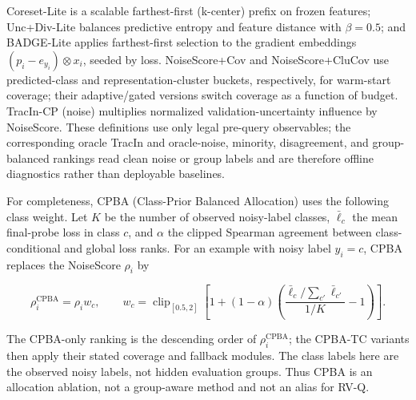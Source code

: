 \documentclass{article}
\begin{document}
Coreset-Lite is a
scalable farthest-first (k-center) prefix on frozen features;
Unc+Div-Lite balances predictive entropy and feature distance with
$\beta=0.5$; and BADGE-Lite applies farthest-first selection to the gradient
embeddings $(p_i-e_{y_i})\otimes x_i$, seeded by loss.  NoiseScore+Cov and
NoiseScore+CluCov use predicted-class and representation-cluster buckets,
respectively, for warm-start coverage; their adaptive/gated versions switch
coverage as a function of budget.  TracIn-CP (noise) multiplies normalized
validation-uncertainty influence by NoiseScore.  These definitions use only
legal pre-query observables; the corresponding oracle TracIn and oracle-noise,
minority, disagreement, and group-balanced rankings read clean noise or group
labels and are therefore offline diagnostics rather than deployable baselines.

For completeness, CPBA (Class-Prior Balanced Allocation) uses the following
class weight. Let $K$ be the number of observed noisy-label classes,
$\bar\ell_c$ the mean final-probe loss in class $c$, and $\alpha$ the clipped
Spearman agreement between class-conditional and global loss ranks. For an
example with noisy label $y_i=c$, CPBA replaces the NoiseScore $\rho_i$ by

\begin{equation}
  \rho_i^{\mathrm{CPBA}}=\rho_i w_c,\qquad
  w_c=\operatorname{clip}_{[0.5,2]}
  \left[1+(1-\alpha)\left(
  \frac{\bar\ell_c/\sum_{c'}\bar\ell_{c'}}{1/K}-1\right)\right].
\end{equation}

The CPBA-only ranking is the descending order of $\rho_i^{\mathrm{CPBA}}$;
the CPBA-TC variants then apply their stated coverage and fallback modules.
The class labels here are the observed noisy labels, not hidden evaluation
groups. Thus CPBA is an allocation ablation, not a group-aware method and not
an alias for RV-Q.
\end{document}
